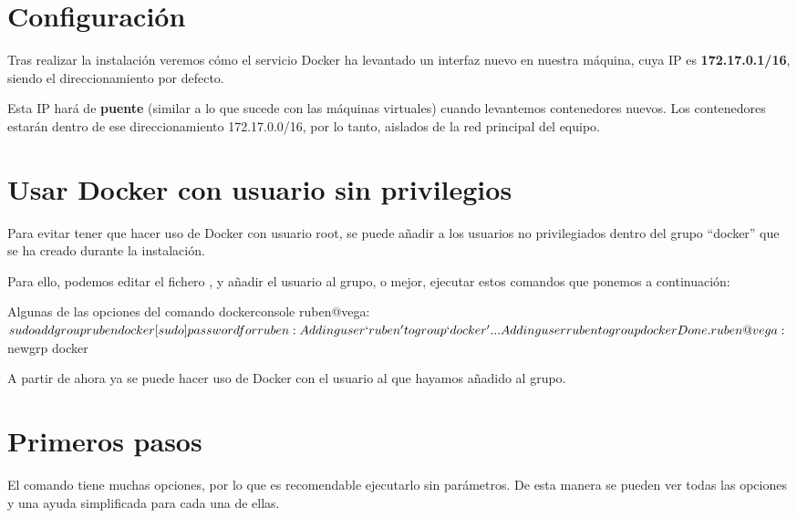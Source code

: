 \section{Configuración}

Tras realizar la instalación veremos cómo el servicio Docker ha levantado un interfaz nuevo en nuestra máquina, cuya IP es \textbf{172.17.0.1/16}, siendo el direccionamiento por defecto.


Esta IP hará de \textbf{puente} (similar a lo que sucede con las máquinas virtuales) cuando levantemos contenedores nuevos. Los contenedores estarán dentro de ese direccionamiento 172.17.0.0/16, por lo tanto, aislados de la red principal del equipo.




\section{Usar Docker con usuario sin privilegios}

Para evitar tener que hacer uso de Docker con usuario root, se puede añadir a los usuarios no privilegiados dentro del grupo “docker” que se ha creado durante la instalación.

Para ello, podemos editar el fichero , y añadir el usuario al grupo, o mejor, ejecutar estos comandos que ponemos a continuación:

\begin{mycode}{Algunas de las opciones del comando docker}{console}{}
ruben@vega:~$ sudo addgroup ruben docker
[sudo] password for ruben:
Adding user `ruben' to group `docker' ...
Adding user ruben to group docker
Done.

ruben@vega:~$ newgrp docker
\end{mycode}

A partir de ahora ya se puede hacer uso de Docker con el usuario al que hayamos añadido al grupo.


\section{Primeros pasos}
El comando  tiene muchas opciones, por lo que es recomendable ejecutarlo sin parámetros. De esta manera se pueden ver todas las opciones y una ayuda simplificada para cada una de ellas.

